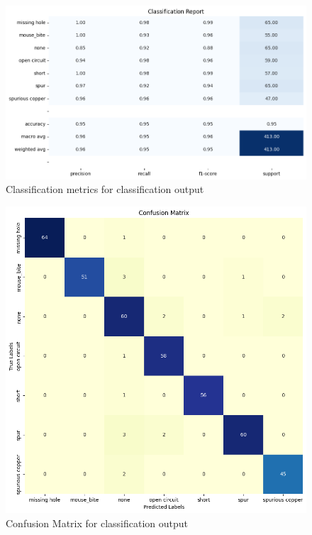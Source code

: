 \documentclass[12pt]{article}
\begin{document}
\bigskip

\begin{figure}[H]
    \centering
    \includegraphics[width=\textwidth]{./graphics/RESUNET_classification_report_graphical_v240618_1.png}
    \caption{Classification metrics for classification output}
    \label{fig:unet_classification_report}
\end{figure}

\begin{figure}[H]
    \centering
    \includegraphics[width=0.7\paperwidth,height=0.7\paperheight,keepaspectratio]{./graphics/RESUNET_confusion_matrix_v240618_1.png}
    \caption{Confusion Matrix for classification output}
    \label{fig:unet_confusion}
\end{figure}
\restoregeometry
\end{document}
